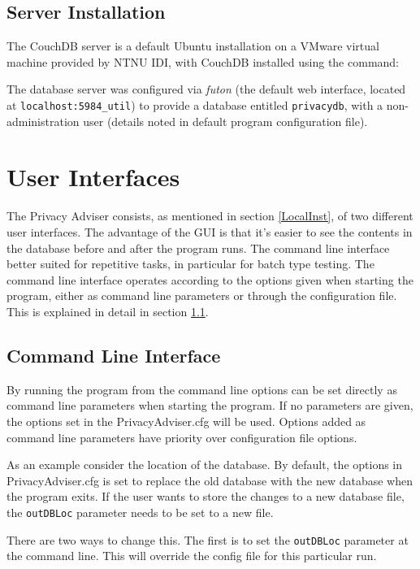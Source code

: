 \subsection{Server Installation}
The CouchDB server is a default Ubuntu installation on a VMware virtual machine provided by NTNU IDI, with CouchDB installed using the command:


The database server was configured via \emph{futon} (the default web interface, located at \texttt{localhost:5984\/\_util}) to provide a database entitled \texttt{privacydb}, with a non-administration user (details noted in default program configuration file).

\section{User Interfaces}
The Privacy Adviser consists, as mentioned in section \ref{LocalInst}, of two different user interfaces. The advantage of the GUI is that it's easier to see the contents in the database before and after the program runs. The command line interface better suited for repetitive tasks, in particular for batch type testing. The command line interface operates according to the options given when starting the program, either as command line parameters or through the configuration file. This is explained in detail in section \ref{cliExplained}.

\subsection{Command Line Interface} \label{cliExplained}
By running the program from the command line options can be set directly as command line parameters when starting the program. If no parameters are given, the options set in the PrivacyAdviser.cfg will be used. Options added as command line parameters have priority over configuration file options.

As an example consider the location of the database. By default, the options in PrivacyAdviser.cfg is set to replace the old database with the new database when the program exits. If the user wants to store the changes to a new database file, the \texttt{outDBLoc} parameter needs to be set to a new file.

There are two ways to change this. The first is to set the \texttt{outDBLoc} parameter at the command line. This will override the config file for this particular run. 

